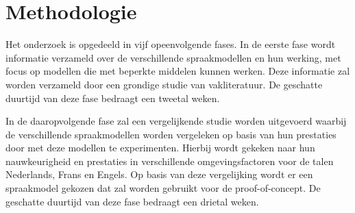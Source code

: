 







\section{Methodologie}%
\label{sec:methodologie}

Het onderzoek is opgedeeld in vijf opeenvolgende fases. In de eerste fase wordt informatie verzameld over de verschillende spraakmodellen en hun werking, met focus op modellen die met beperkte middelen kunnen werken. Deze informatie zal worden verzameld door een grondige studie van vakliteratuur. De geschatte duurtijd van deze fase bedraagt een tweetal weken. 

In de daaropvolgende fase zal een vergelijkende studie worden uitgevoerd waarbij de verschillende spraakmodellen worden vergeleken op basis van hun prestaties door met deze modellen te experimenten. Hierbij wordt gekeken naar hun nauwkeurigheid en prestaties in verschillende omgevingsfactoren voor de talen Nederlands, Frans en Engels. Op basis van deze vergelijking wordt er een spraakmodel gekozen dat zal worden gebruikt voor de proof-of-concept. De geschatte duurtijd van deze fase bedraagt een drietal weken.

